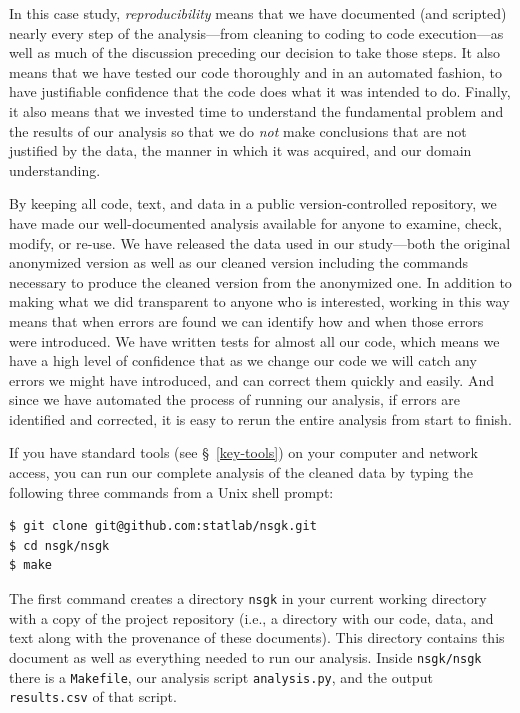 \documentclass[]{article}
\begin{document}
In this case study, \emph{reproducibility} means that we have documented 
(and scripted) nearly
every step of the analysis---from cleaning to coding to code execution---as
well as much of the discussion preceding our decision to take those steps.
It also means that we have tested our code thoroughly and in an automated fashion, 
to have justifiable confidence that the code does what it was intended
to do.
Finally, it also means that we invested time to understand the fundamental
problem and the results of our analysis so that we do \emph{not} make
conclusions that are not justified by the data, the manner in which it was
acquired, and our domain understanding.

By keeping all code, text, and data in a public version-controlled repository, 
we have made our well-documented analysis available
for anyone to examine, check, modify, or re-use.
We have released the data used in our study---both the original anonymized
version as well as our cleaned version including the commands necessary
to produce the cleaned version from the anonymized one.
In addition to making what we did transparent to anyone who is interested,
working in this way means that when errors are found we can identify
how and when those errors were introduced.
We have written tests for almost all our code, which means we have a high
level of confidence that as we change our code we will catch any errors
we might have introduced, and can correct them quickly and easily.
And since we have automated the process of running our analysis, if errors
are identified and corrected, it is easy to rerun the entire analysis from
start to finish.

If you have standard tools (see \S~\ref{key-tools}) on your
computer and network access, you can run our complete analysis of the cleaned
data by typing the following three commands from a Unix shell prompt:
\begin{verbatim}
$ git clone git@github.com:statlab/nsgk.git
$ cd nsgk/nsgk
$ make
\end{verbatim}
The first command creates a directory \texttt{nsgk} in your current working
directory with a copy of the project repository (i.e., a directory with our
code, data, and text along with the provenance of these documents).
This directory contains this document as well as everything needed to run our
analysis.
Inside \texttt{nsgk/nsgk} there is a \texttt{Makefile}, our analysis script
\texttt{analysis.py}, and the output \texttt{results.csv} of that script.
\end{document}
